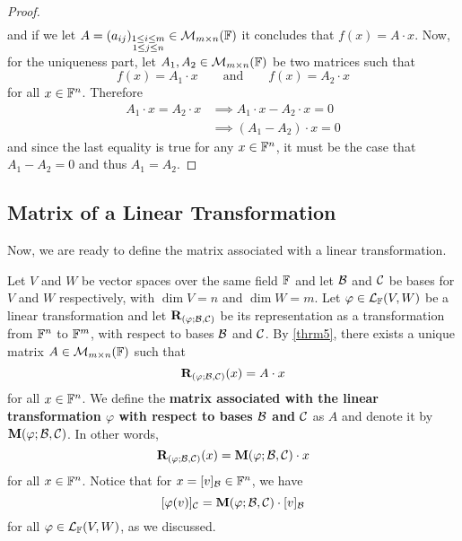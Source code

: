 \begin{proof}
\begin{align*}
    \end{align*}
    and if we let $A = (a_{ij})_{\substack{1 \leq i \leq m \\ 1 \leq j \leq n}} \in \mathcal{M}_{m \times n}(\mathbb{F})$
    it concludes that $f(x) = A \cdot x$. Now, for the uniqueness part, let
    $A_{1}, A_{2} \in \mathcal{M}_{m \times n}(\mathbb{F})$ be two matrices such that
    \[
        f(x) = A_{1} \cdot x \qquad \text{and} \qquad f(x) = A_{2} \cdot x
    \]
    for all $x \in \mathbb{F}^{n}$. Therefore
    \begin{align*}
        A_{1} \cdot x = A_{2} \cdot x &\implies A_{1} \cdot x - A_{2} \cdot x = 0 \\
                                      &\implies (A_{1} - A_{2}) \cdot x = 0
    \end{align*}
    and since the last equality is true for any $x \in \mathbb{F}^{n}$, it must be
    the case that $A_{1} - A_{2} = 0$ and thus $A_{1} = A_{2}$.
\end{proof}


\subsection{Matrix of a Linear Transformation}

Now, we are ready to define the matrix associated with a linear transformation.

\begin{definition} \label{def3}
    Let $V$ and $W$ be vector spaces over the same field $\mathbb{F}$ and let
    $\mathcal{B}$ and $\mathcal{C}$ be bases for $V$ and $W$ respectively, with
    $\dim{V} = n$ and $\dim{W} = m$. Let $\varphi \in \mathcal{L}_{\mathbb{F}}(V, W)$
    be a linear transformation and let $\mathbf{R}_{(\varphi; \mathcal{B}, \mathcal{C})}$ be its representation as a
    transformation from $\mathbb{F}^{n}$ to $\mathbb{F}^{m}$, with respect to bases
    $\mathcal{B}$ and $\mathcal{C}$. By \cref{thrm5}, there exists a unique matrix
    $A \in \mathcal{M}_{m \times n}(\mathbb{F})$ such that
    \[
        \mathbf{R}_{(\varphi; \mathcal{B}, \mathcal{C})}(x) = A \cdot x    
    \]
    for all $x \in \mathbb{F}^{n}$. We define the \textbf{matrix associated with the
    linear transformation $\varphi$ with respect to bases $\mathcal{B}$ and $\mathcal{C}$} as
    $A$ and denote it by $\mathbf{M}(\varphi; \mathcal{B}, \mathcal{C})$. In other words,
    \[
        \mathbf{R}_{(\varphi; \mathcal{B}, \mathcal{C})}(x) = \mathbf{M}(\varphi; \mathcal{B}, \mathcal{C}) \cdot x
    \]
    for all $x \in \mathbb{F}^{n}$. Notice that for $x = [v]_{\mathcal{B}} \in \mathbb{F}^{n}$, we have
    \[
        [\varphi(v)]_{\mathcal{C}} = \mathbf{M}(\varphi; \mathcal{B}, \mathcal{C}) \cdot [v]_{\mathcal{B}}
    \]
    for all $\varphi \in \mathcal{L}_{\mathbb{F}}(V, W)$, as we discussed.
\end{definition}

